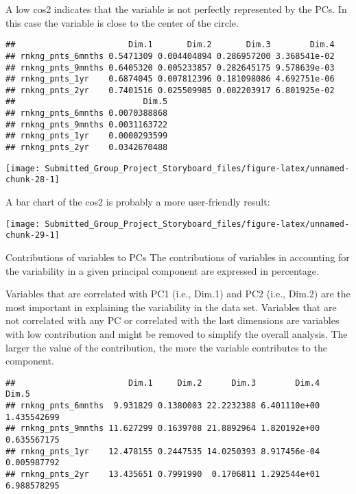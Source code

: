 \documentclass[]{article}
\begin{document}
A low cos2 indicates that the variable is not perfectly represented by
the PCs. In this case the variable is close to the center of the circle.

\begin{verbatim}
##                       Dim.1       Dim.2       Dim.3        Dim.4
## rnkng_pnts_6mnths 0.5471309 0.004404894 0.286957200 3.368541e-02
## rnkng_pnts_9mnths 0.6405320 0.005233857 0.282645175 9.578639e-03
## rnkng_pnts_1yr    0.6874045 0.007812396 0.181098086 4.692751e-06
## rnkng_pnts_2yr    0.7401516 0.025509985 0.002203917 6.801925e-02
##                          Dim.5
## rnkng_pnts_6mnths 0.0070388868
## rnkng_pnts_9mnths 0.0031163722
## rnkng_pnts_1yr    0.0000293599
## rnkng_pnts_2yr    0.0342670488
\end{verbatim}

\begin{center}\texttt{[image: Submitted\_Group\_Project\_Storyboard\_files/figure-latex/unnamed-chunk-28-1]} \end{center}

A bar chart of the cos2 is probably a more user-friendly result:

\begin{center}\texttt{[image: Submitted\_Group\_Project\_Storyboard\_files/figure-latex/unnamed-chunk-29-1]} \end{center}

Contributions of variables to PCs The contributions of variables in
accounting for the variability in a given principal component are
expressed in percentage.

Variables that are correlated with PC1 (i.e., Dim.1) and PC2 (i.e.,
Dim.2) are the most important in explaining the variability in the data
set. Variables that are not correlated with any PC or correlated with
the last dimensions are variables with low contribution and might be
removed to simplify the overall analysis. The larger the value of the
contribution, the more the variable contributes to the component.

\begin{verbatim}
##                       Dim.1     Dim.2      Dim.3        Dim.4       Dim.5
## rnkng_pnts_6mnths  9.931829 0.1380003 22.2232388 6.401110e+00 1.435542699
## rnkng_pnts_9mnths 11.627299 0.1639708 21.8892964 1.820192e+00 0.635567175
## rnkng_pnts_1yr    12.478155 0.2447535 14.0250393 8.917456e-04 0.005987792
## rnkng_pnts_2yr    13.435651 0.7991990  0.1706811 1.292544e+01 6.988578295
\end{verbatim}
\end{document}
